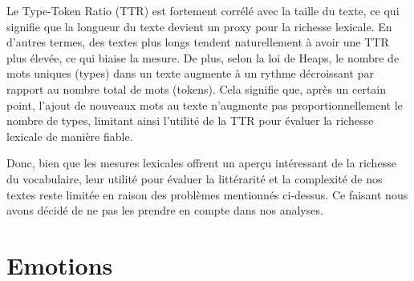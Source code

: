 \documentclass[12pt,a4paper,oneside,titlepage]{book} %
\begin{document}
Le Type-Token Ratio (TTR) est fortement corrélé avec la taille du texte, ce qui signifie que la longueur du texte devient un proxy pour la richesse lexicale. En d'autres termes, des textes plus longs tendent naturellement à avoir une TTR plus élevée, ce qui biaise la mesure. De plus, selon la loi de Heaps, le nombre de mots uniques (types) dans un texte augmente à un rythme décroissant par rapport au nombre total de mots (tokens). Cela signifie que, après un certain point, l'ajout de nouveaux mots au texte n'augmente pas proportionnellement le nombre de types, limitant ainsi l'utilité de la TTR pour évaluer la richesse lexicale de manière fiable. 

Donc, bien que les mesures lexicales offrent un aperçu intéressant de la richesse du vocabulaire, leur utilité pour évaluer la littérarité et la complexité de nos textes reste limitée en raison des problèmes mentionnés ci-dessus. Ce faisant nous avons décidé de ne pas les prendre en compte dans nos analyses.
	
	\section{Emotions}
	
\end{document}
